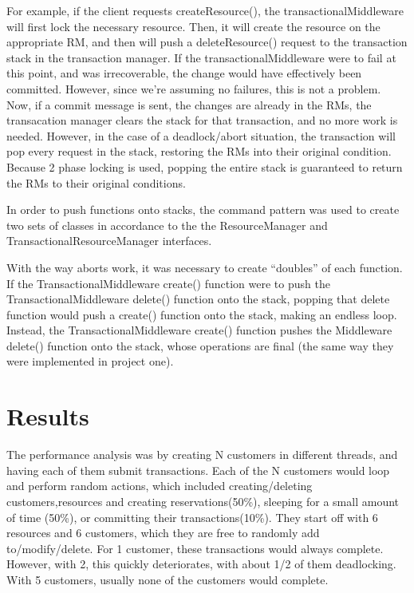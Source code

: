 \documentclass[letterpaper,12pt]{article}
\begin{document}
For example, if the client requests createResource(), the transactionalMiddleware will first lock the necessary resource. Then, it will create the resource on the appropriate RM, and then will push a deleteResource() request to the transaction stack in the transaction manager. If the transactionalMiddleware were to fail at this point, and was irrecoverable, the change would have effectively been committed. However, since we're assuming no failures, this is not a problem. Now, if a commit message is sent, the changes are already in the RMs, the transacation manager clears the stack for that transaction, and no more work is needed. However, in the case of a deadlock/abort situation, the transaction will pop every request in the stack, restoring the RMs into their original condition. Because 2 phase locking is used, popping the entire stack is guaranteed to return the RMs to their original conditions.

In order to push functions onto stacks, the command pattern was used to create two sets of classes in accordance to the the ResourceManager and TransactionalResourceManager interfaces.

With the way aborts work, it was necessary to create ``doubles'' of each function. If the TransactionalMiddleware create() function were to push the TransactionalMiddleware delete() function onto the stack, popping that delete function would push a create() function onto the stack, making an endless loop. Instead, the TransactionalMiddleware create() function pushes the Middleware delete() function onto the stack, whose operations are final (the same way they were implemented in project one).



\section{Results}

The performance analysis was by creating N customers in different threads, and having each of them submit transactions. Each of the N customers would loop and perform random actions, which included creating/deleting customers,resources and creating reservations(50\%), sleeping for a small amount of time (50\%), or committing their transactions(10\%). They start off with 6 resources and 6 customers, which they are free to randomly add to/modify/delete.
For 1 customer, these transactions would always complete. However, with 2, this quickly deteriorates, with about 1/2 of them deadlocking. With 5 customers, usually none of the customers would complete.
\end{document}
